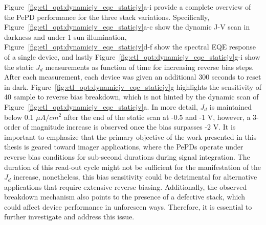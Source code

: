 Figure~\ref{fig:etl_opt:dynamicjv_eqe_staticjv}a-i provide a complete overview of the PePD performance for the three stack variations. Specifically, Figure~\ref{fig:etl_opt:dynamicjv_eqe_staticjv}a-c show the dynamic J-V scan in darkness and under 1 sun illumination, Figure~\ref{fig:etl_opt:dynamicjv_eqe_staticjv}d-f show the spectral EQE response of a single device, and lastly Figure~\ref{fig:etl_opt:dynamicjv_eqe_staticjv}g-i show the static $J_d$ measurements as function of time for increasing reverse bias steps. After each measurement, each device was given an additional 300 seconds to reset in dark. Figure~\ref{fig:etl_opt:dynamicjv_eqe_staticjv}g highlights the sensitivity of 40 sample to reverse bias breakdown, which is not hinted by the dynamic scan of Figure~\ref{fig:etl_opt:dynamicjv_eqe_staticjv}a. In more detail, $J_d$ is maintained below 0.1 $\mu A/cm^2$ after the end of the static scan at -0.5 and -1 V, however, a 3-order of magnitude increase is observed once the bias surpasses -2 V. It is important to emphasize that the primary objective of the work presented in this thesis is geared toward imager applications, where the PePDs operate under reverse bias conditions for sub-second durations during signal integration. The duration of this read-out cycle might not be sufficient for the manifestation of the $J_d$ increase, nonetheless, this bias sensitivity could be detrimental for alternative applications that require extensive reverse biasing. Additionally, the observed breakdown mechanism also points to the presence of a defective stack, which could affect device performance in unforeseen ways. Therefore, it is essential to further investigate and address this issue.


